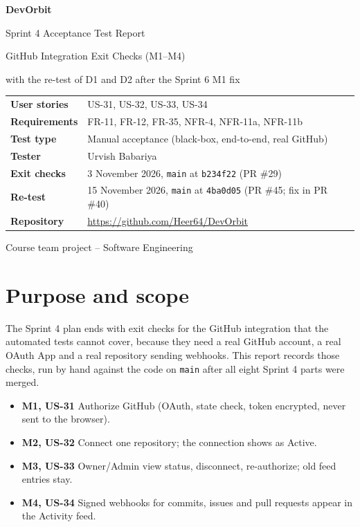 \documentclass[11pt,a4paper]{article}
\begin{document}
\begin{titlepage}
  \centering
  \vspace*{2.5cm}
  {\Huge\bfseries\color{accent} DevOrbit\par}
  \vspace{0.6cm}
  {\LARGE Sprint 4 Acceptance Test Report\par}
  \vspace{0.3cm}
  {\Large GitHub Integration Exit Checks (M1--M4)\par}
  \vspace{0.2cm}
  {\large\color{accent} with the re-test of D1 and D2 after the Sprint 6 M1 fix\par}
  \vspace{1.5cm}
  \begin{tabular}{>{\bfseries}l l}
    User stories   & US-31, US-32, US-33, US-34 \\
    Requirements   & FR-11, FR-12, FR-35, NFR-4, NFR-11a, NFR-11b \\
    Test type      & Manual acceptance (black-box, end-to-end, real GitHub) \\
    Tester         & Urvish Babariya \\
    Exit checks    & 3 November 2026, \texttt{main} at \texttt{b234f22} (PR \#29) \\
    Re-test        & 15 November 2026, \texttt{main} at \texttt{4ba0d05} (PR \#45; fix in PR \#40) \\
    Repository     & \url{https://github.com/Heer64/DevOrbit} \\
  \end{tabular}
  \vfill
  {\small Course team project -- Software Engineering\par}
\end{titlepage}

\tableofcontents
\newpage

\section{Purpose and scope}
The Sprint 4 plan ends with exit checks for the GitHub integration that the automated tests cannot cover,
because they need a real GitHub account, a real OAuth App and a real repository sending webhooks.
This report records those checks, run by hand against the code on \texttt{main} after all eight
Sprint 4 parts were merged.

\begin{itemize}
  \item \textbf{M1, US-31} Authorize GitHub (OAuth, state check, token encrypted, never sent to the browser).
  \item \textbf{M2, US-32} Connect one repository; the connection shows as Active.
  \item \textbf{M3, US-33} Owner/Admin view status, disconnect, re-authorize; old feed entries stay.
  \item \textbf{M4, US-34} Signed webhooks for commits, issues and pull requests appear in the Activity feed.
\end{itemize}
\end{document}
